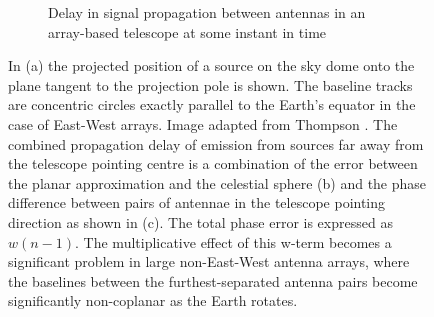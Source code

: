 \begin{figure}[h]
\begin{mdframed}
\begin{subfigure}[b]{0.45\textwidth}
      \caption{Delay in signal propagation between antennas in an array-based telescope at some instant in time}
    \end{subfigure}
    \caption[Widefield phase delay]{In (a) the projected position of a source on the sky dome onto the plane tangent to the projection pole is shown. The baseline tracks
    are concentric circles exactly parallel to the Earth's equator in the case of East-West arrays. Image adapted from Thompson \cite[Lecture 2]{taylor1999synthesis}. 
    The combined propagation delay of emission from sources far away from the telescope pointing centre is a combination
    of the error between the planar approximation and the celestial sphere (b) and the phase difference between pairs of antennae in the telescope
    pointing direction as shown in (c). The total phase error is expressed as $w(n-1)$. The multiplicative effect of this w-term becomes a
    significant problem in large non-East-West antenna arrays, where the baselines between the furthest-separated antenna pairs become significantly non-coplanar 
    as the Earth rotates.}
    \label{fig_wide_field_error}
  \end{mdframed}
\end{figure}

